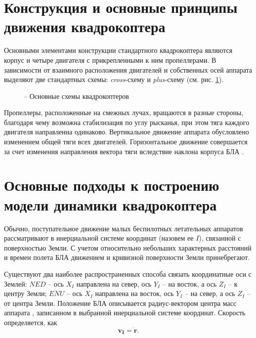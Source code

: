 \section{Конструкция и основные принципы движения квадрокоптера}

Основными элементами конструкции стандартного квадрокоптера являются корпус и четыре двигателя с прикрепленными к ним пропеллерами. В зависимости от взаимного расположения двигателей и собственных осей аппарата выделяют две стандартных схемы: \textit{cross}-схему и \textit{plus}-схему \cite{Bashi01} (см. рис. \ref{fig:cross_plus}).
\begin{figure}[h!]
	\centering
	\quad
	\caption{ -- Основные схемы квадрокоптеров}
	\label{fig:cross_plus}
\end{figure}
Пропеллеры, расположенные на смежных лучах, вращаются в разные стороны, благодаря чему возможна стабилизация по углу рысканья, при этом тяга каждого двигателя направленна одинаково. Вертикальное движение аппарата обусловлено изменением общей тяги всех двигателей. Горизонтальное движение совершается за счет изменения направления вектора тяги вследствие наклона корпуса БЛА \cite{Salih01}. 

\section{Основные подходы к построению модели динамики квадрокоптера}
	
Обычно, поступательное движение малых беспилотных летательных аппаратов рассматривают в инерциальной системе координат (назовем ее {$I$}), связанной с поверхностью Земли. С учетом относительно небольших характерных расстояний и времен полета БЛА движением и кривизной поверхности Земли принебрегают.

Существуют два наиболее распространенных способа связать координатные оси с Землей: {$NED$} --  ось \textbf{$X_I$} направлена на север, ось \textbf{$Y_I$} -- на восток, а ось \textbf{$Z_I$} -- к центру Земли; {$ENU$} -- ось \textbf{$X_I$} направлена на восток, ось \textbf{$Y_I$} -- на север, а ось \textbf{$Z_I$} -- от центра Земли. Положение БЛА описывается радиус-вектором центра масс аппарата , записанном в выбранной инерциальной системе координат. Скорость определяется, как
\begin{equation} \label{eq:velocity}
\bm{v_I} = \dot{\bm{r}}.
\end{equation}

